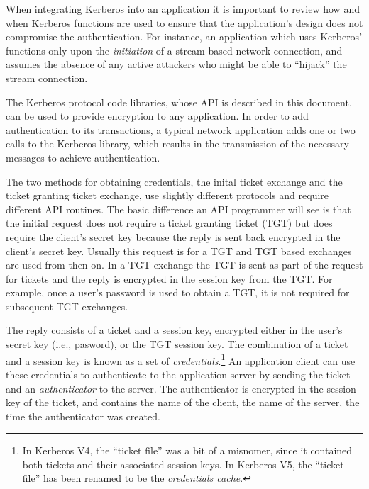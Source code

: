 When integrating Kerberos into an application it is important to
review how and when Kerberos functions are used to ensure that the
application's design does not compromise the authentication.  For
instance, an application which uses Kerberos' functions only upon the
{\em initiation} of a stream-based network connection, and assumes the
absence of any active attackers who might be able to ``hijack'' the
stream connection.


The Kerberos protocol code libraries, whose API is described in this
document, can be used to provide encryption to any application.  In
order to add authentication to its transactions, a typical network
application adds one or two calls to the Kerberos library, which
results in the transmission of the necessary messages to achieve
authentication.

The two methods for obtaining credentials, the inital ticket exchange
and the ticket granting ticket exchange, use slightly different
protocols and require different API routines.  The basic difference an
API programmer will see is that the initial request does not require a
ticket granting ticket (TGT) but does require the client's secret key
because the reply is sent back encrypted in the client's secret key.
Usually this request is for a TGT and TGT based exchanges are used
from then on.  In a TGT exchange the TGT is sent as part of the
request for tickets and the reply is encrypted in the session key from
the TGT.  For example, once a user's password is used to obtain a TGT,
it is not required for subsequent TGT exchanges.

The reply consists of a ticket and a session key, encrypted either in
the user's secret key (i.e., pasword), or the TGT session key.  The
combination of a ticket and a session key is known as a set of {\em
credentials}.\footnote{In Kerberos V4, the ``ticket file'' was a bit of
a misnomer, since it contained both tickets and their associated session
keys.  In Kerberos V5, the ``ticket file'' has been renamed to be the
{\em credentials cache}.} An application client can use these
credentials to authenticate to the application server by sending the
ticket and an {\em authenticator} to the server.  The authenticator is
encrypted in the session key of the ticket, and contains the name of the
client, the name of the server, the time the authenticator was created.

